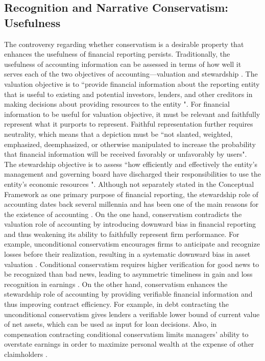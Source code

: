 \documentclass[a4paper]{article}
\begin{document}
\begin{spacing}{2}
\subsection{Recognition and Narrative Conservatism: Usefulness}
The controversy regarding whether conservatism is a desirable property that enhances the usefulness of financial reporting persists. Traditionally, the usefulness of accounting information can be assessed in terms of how well it serves each of the two objectives of accounting---valuation and stewardship \citep*{cascinoUsefulnessFinancialAccounting2017}. The valuation objective is to ``provide financial information about the reporting entity that is useful to existing and potential investors, lenders, and other creditors in making decisions about providing resources to the entity \citep[OB2]{fasbConceptualFrameworkFinancial2018b}". For financial information to be useful for valuation objective, it must be relevant and faithfully represent what it purports to represent. Faithful representation further requires neutrality, which means that a depiction must be ``not slanted, weighted, emphasized, deemphasized, or otherwise manipulated to increase the probability that financial information will be received favorably or unfavorably by users". The stewardship objective is to assess ``how efficiently and effectively the entity's management and governing board have discharged their responsibilities to use the entity's economic resources \cite[OB4]{fasbConceptualFrameworkFinancial2018b}". Although not separately stated in the Conceptual Framework as one primary purpose of financial reporting, the stewardship role of accounting dates back several millennia and has been one of the main reasons for the existence of accounting \citep{lennardStewardshipObjectivesFinancial2007, murphyDiscoursesSurroundingEvolution2013, pelgerPracticesStandardsettingAnalysis2016}. On the one hand, conservatism contradicts the valuation role of accounting by introducing downward bias in financial reporting and thus weakening its ability to faithfully represent firm performance. For example, unconditional conservatism encourages firms to anticipate and recognize losses before their realization, resulting in a systematic downward bias in asset valuation \citep*[e.g.,][]{wattsPositiveAccountingTheory1986}. Conditional conservatism requires higher verification for good news to be recognized than bad news, leading to asymmetric timeliness in gain and loss recognition in earnings \citep*[e.g.,][]{basuConservatismPrincipleAsymmetric1997}. On the other hand, conservatism enhances the stewardship role of accounting by providing verifiable financial information and thus improving contract efficiency. For example, in debt contracting the unconditional conservatism gives lenders a verifiable lower bound of current value of net assets, which can be used as input for loan decisions. Also, in compensation contracting conditional conservatism limits managers' ability to overstate earnings in order to maximize personal wealth at the expense of other claimholders \citep*[e.g.,][]{wattsConservatismAccountingPart2003}.


\end{spacing}
\end{document}
